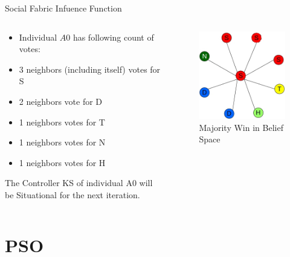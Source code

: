 \documentclass[table]{beamer}
\begin{document}
	\begin{frame}{Social Fabric Infuence Function}
		\begin{columns}
			\begin{column}{0.6\textwidth}
				\begin{block}{}
					\begin{itemize}
						\item Individual $A0$ has following count of votes:
						\item 3 neighbors (including itself) votes for S
						\item 2 neighbors vote for D
						\item 1 neighbors votes for T
						\item 1 neighbors votes for N
						\item 1 neighbors votes for H
					\end{itemize}
				\end{block}
				\begin{block}{}
					The Controller KS of individual A0 will be \alert{Situational} for the next iteration.
				\end{block}
			\end{column}
			\begin{column}{0.4\textwidth}
				\centering
				\begin{figure}[v]
					\includegraphics[scale=0.45]{votingmodel2}
					\centering
					\caption{Majority Win in Belief Space}
					\label{ref:votingmodel2}
				\end{figure}
			\end{column}
		\end{columns}
	\end{frame}
	
	\section{PSO}
	
\end{document}
